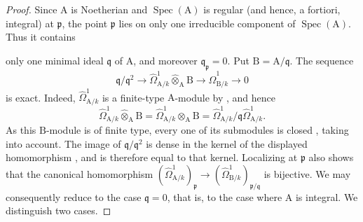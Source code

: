 \begin{proof}
Since $\mathrm{A}$ is Noetherian and $\operatorname{Spec}(\mathrm{A})$ is regular (and hence, a fortiori, integral) at $\mathfrak{p}$, the point $\mathfrak{p}$ lies on only one irreducible component of $\operatorname{Spec}(\mathrm{A})$. Thus it contains


only one minimal ideal $\mathfrak{q}$ of $\mathrm{A}$, and moreover $\mathfrak{q}_{\mathfrak{p}}=0$. Put $\mathrm{B}=\mathrm{A}/\mathfrak{q}$. The sequence 
\[
  \mathfrak{q}/\mathfrak{q}^2\longrightarrow
  \hat{\Omega}^1_{\mathrm{A}/k}\widehat{\otimes}_{\mathrm{A}}\mathrm{B}
  \longrightarrow\hat{\Omega}^1_{\mathrm{B}/k}\longrightarrow0
\]
is exact. Indeed, $\hat{\Omega}^1_{\mathrm{A}/k}$ is a finite-type $\mathrm{A}$-module by , and hence
\[
  \hat{\Omega}^1_{\mathrm{A}/k}\widehat{\otimes}_{\mathrm{A}}\mathrm{B}
  =\hat{\Omega}^1_{\mathrm{A}/k}\otimes_{\mathrm{A}}\mathrm{B}
  =\hat{\Omega}^1_{\mathrm{A}/k}/\mathfrak{q}\hat{\Omega}^1_{\mathrm{A}/k}.
\]
As this $\mathrm{B}$-module is of finite type, every one of its submodules is closed , taking  into account. The image of $\mathfrak{q}/\mathfrak{q}^2$ is dense in the kernel of the displayed homomorphism , and is therefore equal to that kernel. Localizing at $\mathfrak{p}$ also shows that the canonical homomorphism $(\hat{\Omega}^1_{\mathrm{A}/k})_{\mathfrak{p}}\to(\hat{\Omega}^1_{\mathrm{B}/k})_{\mathfrak{p}/\mathfrak{q}}$ is bijective. We may consequently reduce to the case $\mathfrak{q}=0$, that is, to the case where $\mathrm{A}$ is integral. We distinguish two cases.


\end{proof}

